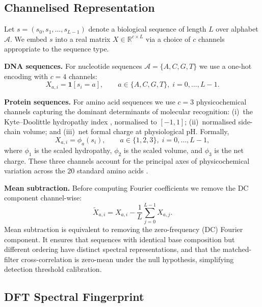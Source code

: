 \documentclass[twocolumn,11pt,a4paper]{article}
\theoremstyle{definition}
\theoremstyle{remark}
\newcommand{\R}{\mathbb{R}}
\begin{document}
\subsection{Channelised Representation}

Let $s = (s_0, s_1, \ldots, s_{L-1})$ denote a biological sequence of length
$L$ over alphabet $\mathcal{A}$. We embed $s$ into a real matrix
$X \in \R^{c \times L}$ via a choice of $c$ channels appropriate to the
sequence type.

\medskip\noindent\textbf{DNA sequences.} For nucleotide sequences
$\mathcal{A} = \{A, C, G, T\}$ we use a one-hot encoding with $c = 4$
channels:
\begin{equation}
  X_{a,i} = \mathbf{1}[s_i = a], \qquad a \in \{A, C, G, T\},\; i = 0,\ldots,L-1.
  \label{eq:onehot}
\end{equation}

\noindent\textbf{Protein sequences.} For amino acid sequences we use $c = 3$
physicochemical channels capturing the dominant determinants of molecular
recognition: (i)~the Kyte--Doolittle hydropathy index \citep{kyte1982},
normalised to $[-1,1]$; (ii)~normalised side-chain volume; and (iii)~net formal
charge at physiological pH. Formally,
\begin{equation}
  X_{a,i} = \phi_a(s_i), \qquad a \in \{1, 2, 3\},\; i = 0,\ldots,L-1,
  \label{eq:protchan}
\end{equation}
where $\phi_1$ is the scaled hydropathy, $\phi_2$ is the scaled volume, and
$\phi_3$ is the net charge. These three channels account for the principal axes
of physicochemical variation across the 20 standard amino acids \citep{kyte1982}.

\medskip\noindent\textbf{Mean subtraction.} Before computing Fourier
coefficients we remove the DC component channel-wise:
\begin{equation}
  \widetilde{X}_{a,i} = X_{a,i} - \frac{1}{L}\sum_{j=0}^{L-1} X_{a,j}.
  \label{eq:mean_sub}
\end{equation}
Mean subtraction is equivalent to removing the zero-frequency (DC) Fourier
component. It ensures that sequences with identical base composition but
different ordering have distinct spectral representations, and that the
matched-filter cross-correlation is zero-mean under the null hypothesis,
simplifying detection threshold calibration.

\subsection{DFT Spectral Fingerprint}
\end{document}

